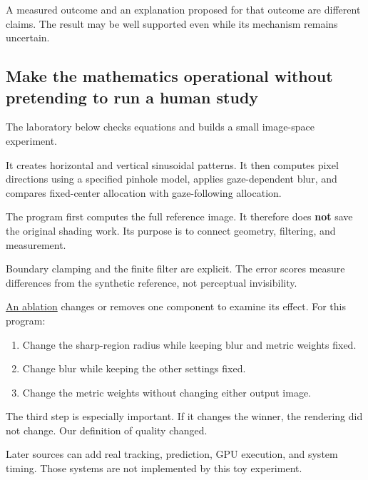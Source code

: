 A measured outcome and an explanation proposed for that outcome are different claims. The result may be well supported even while its mechanism remains uncertain.

\subsection{Make the mathematics operational without pretending to run a human study}\label{04-visual-computing-ii-ch043-make-the-mathematics-operational-without-pretending-to-run-a-human-study}

\hypertarget{04-visual-computing-ii-ch043-make-the-mathematics-operational-without-pretending-to-run-a-human-study}{}

The laboratory below checks equations and builds a small image-space experiment.

It creates horizontal and vertical sinusoidal patterns. It then computes pixel directions using a specified pinhole model, applies gaze-dependent blur, and compares fixed-center allocation with gaze-following allocation.

The program first computes the full reference image. It therefore does \textbf{not} save the original shading work. Its purpose is to connect geometry, filtering, and measurement.

Boundary clamping and the finite filter are explicit. The error scores measure differences from the synthetic reference, not perceptual invisibility.

\hyperref[appendix-65788587ef78]{An ablation} changes or removes one component to examine its effect. For this program:

\begin{enumerate}
\def\labelenumi{\arabic{enumi}.}
\tightlist
\item
  Change the sharp-region radius while keeping blur and metric weights fixed.
\item
  Change blur while keeping the other settings fixed.
\item
  Change the metric weights without changing either output image.
\end{enumerate}

The third step is especially important. If it changes the winner, the rendering did not change. Our definition of quality changed.

Later sources can add real tracking, prediction, GPU execution, and system timing. Those systems are not implemented by this toy experiment.

